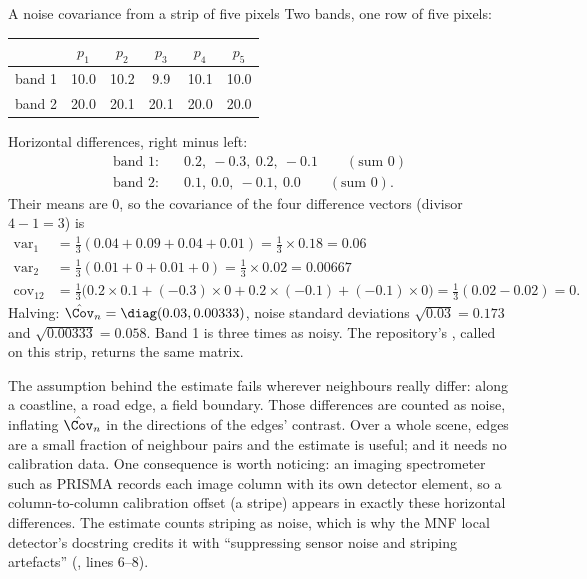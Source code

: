 \begin{worked}[label={we:localrx:noise}]{A noise covariance from a strip of five pixels}
Two bands, one row of five pixels:
\begin{center}
\begin{tabular}{cccccc}
\toprule
& $p_1$ & $p_2$ & $p_3$ & $p_4$ & $p_5$\\
\midrule
band 1 & 10.0 & 10.2 & 9.9  & 10.1 & 10.0\\
band 2 & 20.0 & 20.1 & 20.1 & 20.0 & 20.0\\
\bottomrule
\end{tabular}
\end{center}
Horizontal differences, right minus left:
\begin{align*}
\text{band 1:}&\quad 0.2,\ -0.3,\ 0.2,\ -0.1 \qquad(\text{sum } 0)\\
\text{band 2:}&\quad 0.1,\ 0.0,\ -0.1,\ 0.0 \qquad(\text{sum } 0).
\end{align*}
Their means are 0, so the covariance of the four difference vectors (divisor $4 - 1 = 3$) is
\begin{align*}
\text{var}_1 &= \tfrac13(0.04 + 0.09 + 0.04 + 0.01) = \tfrac13\times0.18 = 0.06\\
\text{var}_2 &= \tfrac13(0.01 + 0 + 0.01 + 0) = \tfrac13\times0.02 = 0.00667\\
\text{cov}_{12} &= \tfrac13\big(0.2\times0.1 + (-0.3)\times0 + 0.2\times(-0.1) + (-0.1)\times0\big)
  = \tfrac13(0.02 - 0.02) = 0 .
\end{align*}
Halving: $\hat\Cov_n = \diag(0.03, 0.00333)$, noise standard deviations $\sqrt{0.03} = 0.173$ and
$\sqrt{0.00333} = 0.058$. Band 1 is three times as noisy. The repository's
, called on this strip, returns the same matrix\tagC.
\end{worked}

The assumption behind the estimate fails wherever neighbours really differ: along a coastline, a road
edge, a field boundary. Those differences are counted as noise, inflating $\hat\Cov_n$ in the directions
of the edges' contrast. Over a whole scene, edges are a small fraction of neighbour pairs and the
estimate is useful; and it needs no calibration data. One consequence is worth noticing: an
imaging spectrometer such as PRISMA records each image column with its own detector element, so a
column-to-column calibration offset (a stripe) appears in exactly these horizontal differences. The
estimate counts striping as noise, which is why the MNF local detector's docstring credits it with
``suppressing sensor noise and striping artefacts'' (, lines
6--8).

